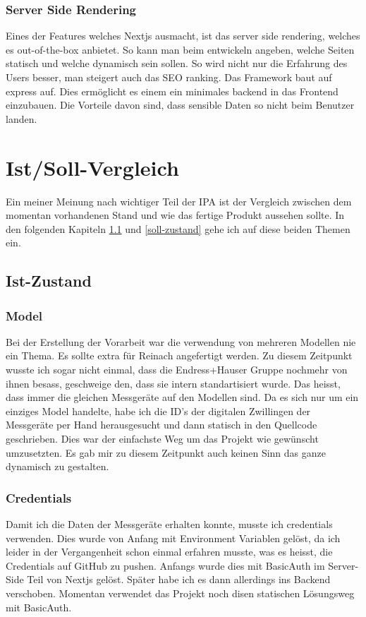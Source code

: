 \subsubsection{Server Side Rendering}
Eines der Features welches Nextjs ausmacht, ist das server side rendering, welches es out-of-the-box anbietet. So kann man beim entwickeln angeben, welche Seiten statisch und welche dynamisch sein sollen. So wird nicht nur die Erfahrung des Users besser, man steigert auch das SEO ranking. Das Framework baut auf express auf. Dies ermöglicht es einem ein minimales backend in das Frontend einzubauen. Die Vorteile davon sind, dass sensible Daten so nicht beim Benutzer landen.
\section{Ist/Soll-Vergleich}
Ein meiner Meinung nach wichtiger Teil der IPA ist der Vergleich zwischen dem momentan vorhandenen Stand und wie das fertige Produkt aussehen sollte. In den folgenden Kapiteln \ref{ist-zustand} und \ref{soll-zustand} gehe ich auf diese beiden Themen ein.
\subsection{Ist-Zustand} \label{ist-zustand}
\subsubsection{Model}
Bei der Erstellung der Vorarbeit war die verwendung von mehreren Modellen nie ein Thema. Es sollte extra für Reinach angefertigt werden. Zu diesem Zeitpunkt wusste ich sogar nicht einmal, dass die Endress+Hauser Gruppe nochmehr von ihnen besass, geschweige den, dass sie intern standartisiert wurde. Das heisst, dass immer die gleichen Messgeräte auf den Modellen sind.
\newline
Da es sich nur um ein einziges Model handelte, habe ich die ID's der digitalen Zwillingen der Messgeräte per Hand herausgesucht und dann statisch in den Quellcode geschrieben. Dies war der einfachste Weg um das Projekt wie gewünscht umzusetzten. Es gab mir zu diesem Zeitpunkt auch keinen Sinn das ganze dynamisch zu gestalten.
\subsubsection{Credentials}
Damit ich die Daten der Messgeräte erhalten konnte, musste ich credentials verwenden. Dies wurde von Anfang mit Environment Variablen gelöst, da ich leider in der Vergangenheit schon einmal erfahren musste, was es heisst, die Credentials auf GitHub zu pushen. Anfangs wurde dies mit BasicAuth im Server-Side Teil von Nextjs gelöst. Später habe ich es dann allerdings ins Backend verschoben. Momentan verwendet das Projekt noch disen statischen Lösungsweg mit BasicAuth.
